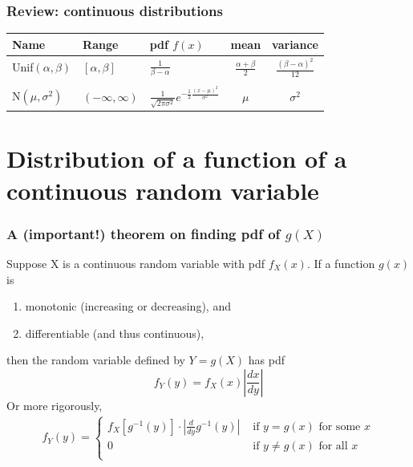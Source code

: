 \documentclass[slidestop,compress,mathserif]{beamer}
\begin{document}
\begin{frame}\frametitle{Review: continuous distributions}

\begin{center}
\begin{tabular}{lllcc}
\hline
			Name 					& Range 			& pdf $f(x)$																& mean 						& variance \\
\hline
Unif$(\alpha, \beta)$		& $[\alpha, \beta]$	& $\frac{1}{\beta - \alpha}$											& $\frac{\alpha + \beta}{2}$	& $\frac{(\beta - \alpha)^2}{12}$\\
&&&&\\
N$(\mu, \sigma^2)$		& $(-\infty, \infty)$	& $\frac{1}{\sqrt{2\pi\sigma^2}}e^{ -\frac{1}{2}\frac{(x-\mu)^2}{\sigma^2}}$	& $\mu$						& $\sigma^2$\\ 
\hline
\end{tabular}
\end{center}

\end{frame}


\section{Distribution of a function of a continuous random variable}

\begin{frame}
\frametitle{A (important!) theorem on finding pdf of $g(X)$}
Suppose X is a continuous random variable with pdf $f_X(x)$. If a function $g(x)$ is
\begin{enumerate}
\item monotonic (increasing or decreasing), and
\item differentiable (and thus continuous),
\end{enumerate}
then the random variable defined by $Y = g(X)$ has pdf
\[ f_Y ( y ) = f_X( x )  \left|\frac{dx}{dy}\right| \]
Or more rigorously,
\begin{align*}
f_Y ( y ) =
  \begin{cases}
  f_X\left[ g^{-1}(y) \right] \cdot \left|\frac{d}{dy}g^{-1}(y)\right| & \text{ if } y = g(x) \text{ for some } x \\
  0 													 & \text{ if } y \neq g(x) \text{ for all } x \\
  \end{cases}
\end{align*}

\end{frame}
\end{document}
